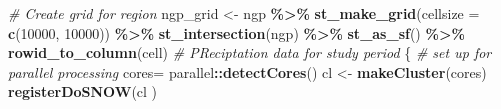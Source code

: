 \documentclass[
]{article}
\newenvironment{Shaded}{\begin{snugshade}}{\end{snugshade}}
\newcommand{\AttributeTok}[1]{\textcolor[rgb]{0.13,0.29,0.53}{#1}}
\newcommand{\CommentTok}[1]{\textcolor[rgb]{0.56,0.35,0.01}{\textit{#1}}}
\newcommand{\DecValTok}[1]{\textcolor[rgb]{0.00,0.00,0.81}{#1}}
\newcommand{\FunctionTok}[1]{\textcolor[rgb]{0.13,0.29,0.53}{\textbf{#1}}}
\newcommand{\NormalTok}[1]{#1}
\newcommand{\OtherTok}[1]{\textcolor[rgb]{0.56,0.35,0.01}{#1}}
\newcommand{\SpecialCharTok}[1]{\textcolor[rgb]{0.81,0.36,0.00}{\textbf{#1}}}
\newcommand{\StringTok}[1]{\textcolor[rgb]{0.31,0.60,0.02}{#1}}
\begin{document}
\begin{Shaded}
\begin{Highlighting}[]
\CommentTok{\# Create grid for region }
\NormalTok{  ngp\_grid }\OtherTok{\textless{}{-}} 
\NormalTok{    ngp }\SpecialCharTok{\%\textgreater{}\%}
      \FunctionTok{st\_make\_grid}\NormalTok{(}\AttributeTok{cellsize =} \FunctionTok{c}\NormalTok{(}\DecValTok{10000}\NormalTok{, }\DecValTok{10000}\NormalTok{)) }\SpecialCharTok{\%\textgreater{}\%}
      \FunctionTok{st\_intersection}\NormalTok{(ngp)  }\SpecialCharTok{\%\textgreater{}\%} 
      \FunctionTok{st\_as\_sf}\NormalTok{() }\SpecialCharTok{\%\textgreater{}\%}
      \FunctionTok{rowid\_to\_column}\NormalTok{(}\StringTok{\textquotesingle{}cell\textquotesingle{}}\NormalTok{)}
\CommentTok{\# PReciptation data for study period}
\NormalTok{\{}
  \CommentTok{\# set up for parallel processing}
\NormalTok{  cores}\OtherTok{=}\NormalTok{ parallel}\SpecialCharTok{::}\FunctionTok{detectCores}\NormalTok{()}
\NormalTok{  cl }\OtherTok{\textless{}{-}} \FunctionTok{makeCluster}\NormalTok{(cores) }
  \FunctionTok{registerDoSNOW}\NormalTok{(cl )}
  

\end{Highlighting}
\end{Shaded}
\end{document}
